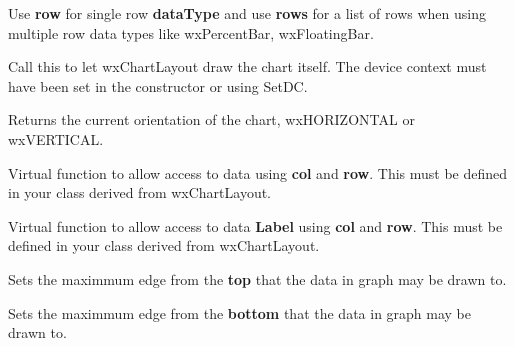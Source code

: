 Use {\bf row} for single row {\bf dataType} and use {\bf rows} for a list of rows when using multiple row data types
like wxPercentBar, wxFloatingBar.

\label{draw}


Call this to let wxChartLayout draw the chart itself. The device context must
have been set in the constructor or using SetDC.

\label{get3d}


\label{getorientation}


Returns the current orientation of the chart, wxHORIZONTAL or wxVERTICAL.

\label{getdatastyle}


\label{getdata}


Virtual function to allow access to data using {\bf col} and\rtfsp
{\bf row}. This must be defined in your class derived from
wxChartLayout. 

\label{getlabel}


Virtual function to allow access to data {\bf Label} using\rtfsp
{\bf col} and {\bf row}. This must be defined in your class
derived from wxChartLayout. 

\label{setedgetop}


Sets the maximmum edge from the {\bf top} that the data in graph may be drawn to.

\label{setedgebottom}
	

Sets the maximmum edge from the {\bf bottom} that the data in graph may be drawn to.

\label{setedgeleft}

